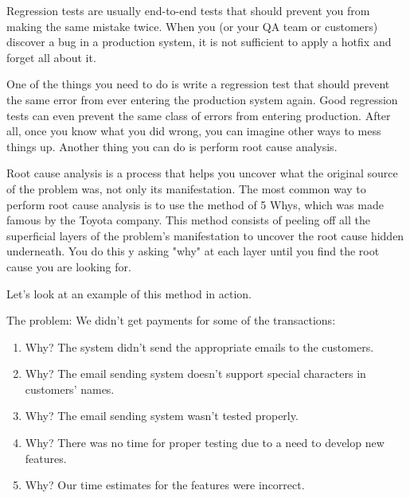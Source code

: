 
Regression tests are usually end-to-end tests that should prevent you from making the same mistake twice. When you (or your QA team or customers) discover a bug in a production system, it is not sufficient to apply a hotfix and forget all about it.

One of the things you need to do is write a regression test that should prevent the same error from ever entering the production system again. Good regression tests can even prevent the same class of errors from entering production. After all, once you know what you did wrong, you can imagine other ways to mess things up. Another thing you can do is perform root cause analysis.


Root cause analysis is a process that helps you uncover what the original source of the problem was, not only its manifestation. The most common way to perform root cause analysis is to use the method of 5 Whys, which was made famous by the Toyota company. This method consists of peeling off all the superficial layers of the problem's manifestation to uncover the root cause hidden underneath. You do this y asking "why" at each layer until you find the root cause you are looking for.

Let's look at an example of this method in action.

The problem: We didn't get payments for some of the transactions:

\begin{enumerate}
\item 
Why? The system didn't send the appropriate emails to the customers.

\item 
Why? The email sending system doesn't support special characters in customers' names.

\item 
Why? The email sending system wasn't tested properly.

\item 
Why? There was no time for proper testing due to a need to develop new features.

\item 
Why? Our time estimates for the features were incorrect.
\end{enumerate}

